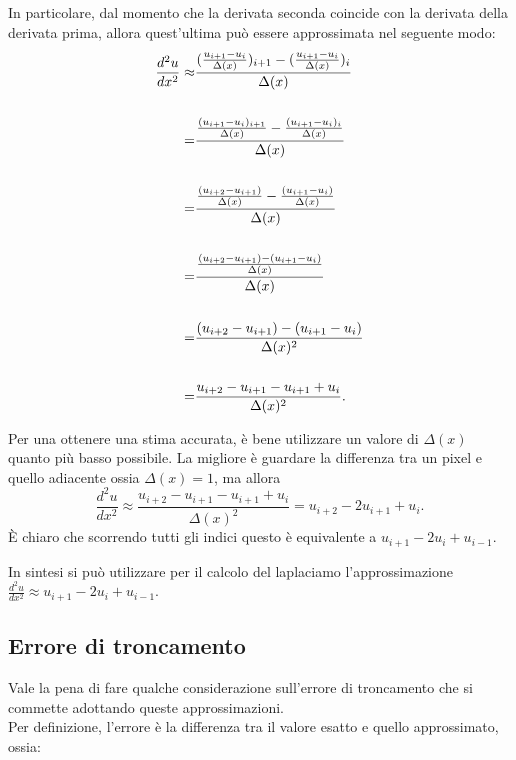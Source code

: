 \newpage
\raggedright
In particolare, dal momento che la derivata seconda coincide con la derivata della derivata prima, allora quest'ultima può essere approssimata nel seguente modo:\\
\centering    
{\large
\begin{align*}
\frac{d^2u}{dx^2} \approx &
\frac{
(\frac{u_{i+1} - u_i}{\Delta(x)})_{i+1} 
- 
(\frac{u_{i+1} - u_i}{\Delta(x)})_i
}{\Delta(x)}
\\
\vline
\\
= &
\frac{
\frac{(u_{i+1} - u_i)_{i+1}}{\Delta(x)} 
-   
\frac{(u_{i+1} - u_i)_i}{\Delta(x)}
}{\Delta(x)}
\\
\vline 
\\
= &
\frac{
\frac{(u_{i+2} - u_{i+1})}{\Delta(x)} 
- 
\frac{(u_{i+1} - u_i)}{\Delta(x)}
}{\Delta(x)}
\\
\vline 
\\
= &
\frac{
\frac{(u_{i+2} - u_{i+1}) 
- 
(u_{i+1} - u_i)}{\Delta(x)}
}{\Delta(x)}
\\
\vline
\\
= &
\frac{
(u_{i+2} - u_{i+1}) 
- 
(u_{i+1} - u_i)}
{\Delta(x)^2}
\\
\vline 
\\
= &
\frac{
 u_{i+2} - u_{i+1} 
-u_{i+1} + {u_i}}
{\Delta(x)^2}
.\\
\end{align*}
}
\raggedright
Per una ottenere una stima accurata, è bene utilizzare un valore di $\Delta(x)$ quanto più basso possibile. La migliore è guardare la differenza tra un pixel e quello adiacente ossia $\Delta(x)=1$, ma allora 
{\large
$$\frac{d^2u}{dx^2} \approx
\frac{
 u_{i+2} - u_{i+1} 
-u_{i+1} + u_i}
{\Delta(x)^2} = u_{i+2} -2 u_{i+1} + u_i.$$
}
\`E chiaro che scorrendo tutti gli indici questo è equivalente a $u_{i+1} -2 u_i + u_{i-1}.$

In sintesi si può utilizzare per il calcolo del laplaciamo l'approssimazione \\
\vspace{2pt}
\centering 
{\Large
$\frac{d^2u}{dx^2} \approx u_{i+1} -2 u_i + u_{i-1}$.\\
}
\vspace{2pt}
\raggedright
\newpage
\subsection{Errore di troncamento}

Vale la pena di fare qualche considerazione sull'errore di troncamento che si commette adottando queste approssimazioni.\\
Per definizione, l'errore è la differenza tra il valore esatto e quello approssimato, ossia: 

